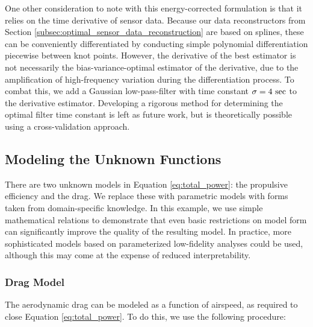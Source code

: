 \documentclass[conf]{new-aiaa}
\begin{document}
    One other consideration to note with this energy-corrected formulation is that it relies on the time derivative of sensor data. Because our data reconstructors from Section \ref{subsec:optimal_sensor_data_reconstruction} are based on splines, these can be conveniently differentiated by conducting simple polynomial differentiation piecewise between knot points. However, the derivative of the best estimator is not necessarily the bias-variance-optimal estimator of the derivative, due to the amplification of high-frequency variation during the differentiation process. To combat this, we add a Gaussian low-pass-filter with time constant $\sigma=4\ \rm sec$ to the derivative estimator. Developing a rigorous method for determining the optimal filter time constant is left as future work, but is theoretically possible using a cross-validation approach.

    \subsection{Modeling the Unknown Functions}
    \label{subsec:modeling_unknown_functions}

    There are two unknown models in Equation \ref{eq:total_power}: the propulsive efficiency and the drag. We replace these with parametric models with forms taken from domain-specific knowledge. In this example, we use simple mathematical relations to demonstrate that even basic restrictions on model form can significantly improve the quality of the resulting model. In practice, more sophisticated models based on parameterized low-fidelity analyses could be used, although this may come at the expense of reduced interpretability.

    \subsubsection{Drag Model}
    \label{subsubsec:drag_model}
    The aerodynamic drag can be modeled as a function of airspeed, as required to close Equation \ref{eq:total_power}. To do this, we use the following procedure:
\end{document}
